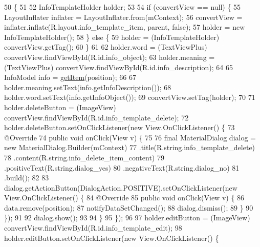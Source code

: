 \begin{DoxyCode}
50                                                                                 \{
51 
52         InfoTemplateHolder holder;
53 
54         \textcolor{keywordflow}{if} (convertView == null) \{
55             LayoutInflater inflater = LayoutInflater.from(mContext);
56             convertView = inflater.inflate(R.layout.info\_template\_item, parent, \textcolor{keyword}{false});
57             holder = \textcolor{keyword}{new} InfoTemplateHolder();
58         \} \textcolor{keywordflow}{else} \{
59             holder = (InfoTemplateHolder) convertView.getTag();
60         \}
61 
62         holder.word = (TextViewPlus) convertView.findViewById(R.id.info\_object);
63         holder.meaning = (TextViewPlus) convertView.findViewById(R.id.info\_description);
64 
65         InfoModel info = \hyperlink{classorg_1_1buildmlearn_1_1toolkit_1_1templates_1_1InfoAdapter_a12c0148c366d316ed25b8765381eb4d1}{getItem}(position);
66 
67         holder.meaning.setText(info.getInfoDescription());
68         holder.word.setText(info.getInfoObject());
69         convertView.setTag(holder);
70 
71         holder.deleteButton = (ImageView) convertView.findViewById(R.id.info\_template\_delete);
72         holder.deleteButton.setOnClickListener(\textcolor{keyword}{new} View.OnClickListener() \{
73             @Override
74             \textcolor{keyword}{public} \textcolor{keywordtype}{void} onClick(View v) \{
75 
76                 \textcolor{keyword}{final} MaterialDialog dialog = \textcolor{keyword}{new} MaterialDialog.Builder(mContext)
77                         .title(R.string.info\_template\_delete)
78                         .content(R.string.info\_delete\_item\_content)
79                         .positiveText(R.string.dialog\_yes)
80                         .negativeText(R.string.dialog\_no)
81                         .build();
82 
83                 dialog.getActionButton(DialogAction.POSITIVE).setOnClickListener(\textcolor{keyword}{new} View.OnClickListener()
       \{
84                     @Override
85                     \textcolor{keyword}{public} \textcolor{keywordtype}{void} onClick(View v) \{
86                         data.remove(position);
87                         notifyDataSetChanged();
88                         dialog.dismiss();
89                     \}
90                 \});
91 
92                 dialog.show();
93 
94             \}
95         \});
96 
97         holder.editButton = (ImageView) convertView.findViewById(R.id.info\_template\_edit);
98         holder.editButton.setOnClickListener(\textcolor{keyword}{new} View.OnClickListener() \{

\end{DoxyCode}
